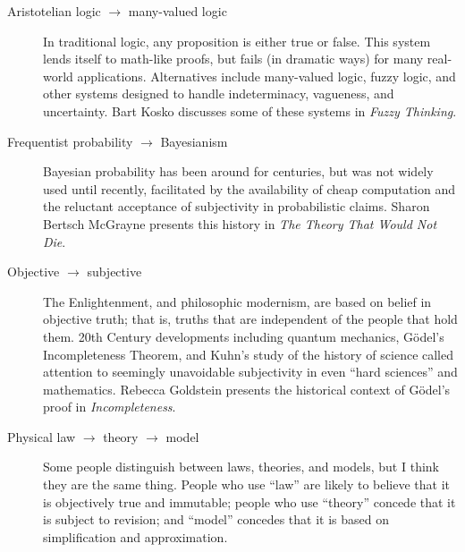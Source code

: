 \documentclass[12pt]{book}
\theoremstyle{exercise}
\begin{document}
\begin{description}

\item[Aristotelian logic $\rightarrow$ many-valued logic] In
  traditional logic, any proposition is either true or false.  This
  system lends itself to math-like proofs, but fails (in dramatic
  ways) for many real-world applications.  Alternatives include
  many-valued logic, fuzzy logic, and other systems designed to handle
  indeterminacy, vagueness, and uncertainty.  Bart
  Kosko discusses some of these systems in {\em Fuzzy
    Thinking}.


\item[Frequentist probability $\rightarrow$ Bayesianism] Bayesian
  probability has been around for centuries, but was not widely used
  until recently, facilitated by the availability of cheap computation
  and the reluctant acceptance of subjectivity
  in probabilistic claims.  Sharon Bertsch McGrayne presents this
  history in {\em The Theory That Would Not Die}.


\item[Objective $\rightarrow$ subjective] The Enlightenment, and
  philosophic modernism, are based on belief in objective truth; that
  is, truths that are independent of the people that hold them.  20th
  Century developments including quantum mechanics, G\"{o}del's
  Incompleteness Theorem, and Kuhn's study of the history of science
  called attention to seemingly unavoidable subjectivity in
  even ``hard sciences'' and mathematics.  Rebecca Goldstein presents
  the historical context of G\"{o}del's proof in {\it Incompleteness}.


\item[Physical law $\rightarrow$ theory $\rightarrow$ model]
  Some people distinguish between laws, theories, and models, but
  I think they are the same thing.
  People who use ``law'' are likely to
  believe that it is objectively true and immutable; people who use
  ``theory'' concede that it is subject to revision; and ``model''
  concedes that it is based on simplification and approximation.


\end{description}
\end{document}
